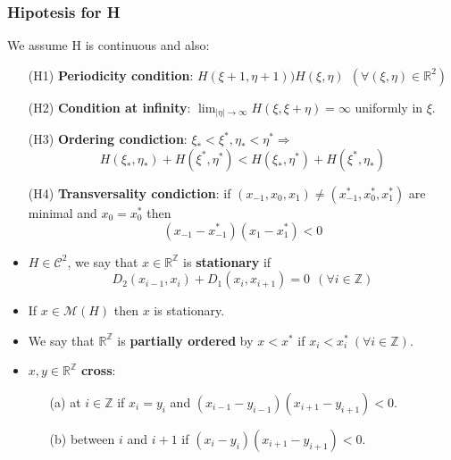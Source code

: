 \documentclass[12 pt]{beamer}
\begin{document}
\begin{frame}{6}
	\frametitle{Hipotesis for H}
	We assume H is continuous and also:
	\begin{itemize}
		\item[(H1)] \textbf{Periodicity condition}: $H(\xi + 1, \eta + 1) ) H(\xi, \eta) \ \ (\forall (\xi, \eta) \in \mathbb{R}^{2})$
		\item[(H2)] \textbf{Condition at infinity}: $\lim_{|\eta| \rightarrow \infty } H(\xi, \xi + \eta) = \infty$ uniformly in $\xi$.
		\item[(H3)] \textbf{Ordering condiction}: $\xi_{*} < \xi^{*}, \eta_{*} < \eta^{*} \Rightarrow $
			$$
				H(\xi_{*}, \eta_{*}) + H(\xi^{*}, \eta^{*}) < H(\xi_{*}, \eta^{*}) + H(\xi^{*}, \eta_{*})
			$$
		\item[(H4)] \textbf{Transversality condiction}: if $(x_{-1}, x_0, x_1) \neq (x_{-1}^{*}, x_{0}^{*}, x_{1}^{*})$ are minimal and $x_0 = x_{0}^{*}$ then
			$$
				(x_{-1} - x_{-1}^{*})(x_{1} - x_{1}^{*}) < 0
			$$
	\end{itemize}
\end{frame}
 
\begin{frame}{7}
	\begin{itemize}
		\item $H \in \mathcal{C}^{2}$, we say that $x \in \mathbb{R}^{\mathbb{Z}}$ is \textbf{stationary} if 
			$$
				D_2 (x_{i - 1}, x_i) + D_1 (x_{i}, x_{i + 1}) = 0 \ \ (\forall i \in \mathbb{Z}) 
			$$
		\item If $x \in \mathcal{M}(H)$ then $x$ is stationary.
		\item We say that $\mathbb{R}^{\mathbb{Z}}$ is \textbf{partially ordered} by $x < x^{*}$ if $x_{i} < x^{*}_{i} \ (\forall i \in \mathbb{Z})$.
		\item $x, y \in \mathbb{R}^{\mathbb{Z}}$ \textbf{cross}:
			\begin{itemize}
				\item[(a)] at $i \in \mathbb{Z}$ if $x_i = y_i$ and $(x_{i - 1} - y_{i - 1}) (x_{i + 1} - y_{i + 1}) < 0$.
				\item[(b)] between $i$ and $i + 1$ if $(x_{i} - y_{i}) (x_{i + 1} - y_{i + 1}) < 0$.
			\end{itemize}
	\end{itemize}

\end{frame}

\begin{frame}
	
\end{frame}
\end{document}
